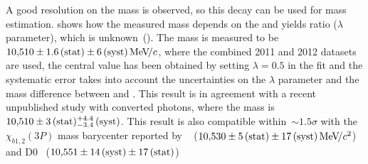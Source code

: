 A good resolution on the \chiboneThreeP mass is observed, so this decay can be
used for \chiboneThreeP mass estimation.  shows how the
measured \chiboneThreeP mass depends on the \chiboneThreeP and \chibtwoThreeP
yields ratio ($\lambda$ parameter), which is unknown~().
The \chiboneThreeP mass is measured to be $10{,}510 \pm
1.6\mathrm{\,(stat)} \pm 6\mathrm{\,(syst)} {\mathrm{\,Me\kern -0.1em V\!/}c}$, where the combined 2011 and 2012 datasets are used, 
the central value has been obtained by setting $\lambda = 0.5$ in the fit and the 
systematic error takes into account the uncertainties on  
the $\lambda$ parameter and the mass difference between \chiboneThreeP and \chibtwoThreeP. 
This result is in agreement with a recent unpublished
\lhcb study with converted photons, where the \chiboneThreeP mass is
$10{,}510 \pm 3\mathrm{\,(stat)}{}^{+4.4}_{-3.4}\mathrm{\,(syst)}$. This result is also compatible within~$\sim{}1.5\sigma$ with 
the $\chi_{b1,2}(3P)$ mass barycenter reported by \atlas~\cite{Aad:2011ih} ($10{,}530 \pm 5\mathrm{\,(stat)}
\pm 17\mathrm{\,(syst)} {\mathrm{\,Me\kern -0.1em V\!/}c^2}$) and D0~\cite{Abazov:2012gh}  ($10{,}551 \pm 14\mathrm{\,(syst)} \pm 17\mathrm{\,(stat)}$)



% 



